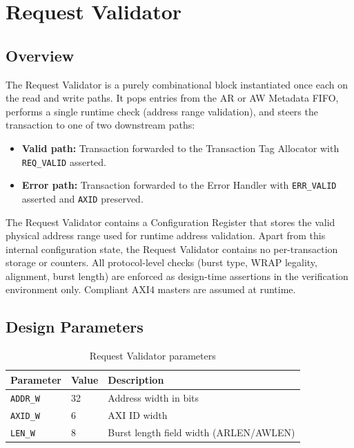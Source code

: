 \section{Request Validator}
\subsection{Overview}

The Request Validator is a purely combinational block instantiated once
each on the read and write paths. It pops entries from the AR or AW
Metadata FIFO, performs a single runtime check (address range
validation), and steers the transaction to one of two downstream paths:

\begin{itemize}
  \item \textbf{Valid path:} Transaction forwarded to the Transaction
        Tag Allocator with \texttt{REQ\_VALID} asserted.
  \item \textbf{Error path:} Transaction forwarded to the Error Handler
        with \texttt{ERR\_VALID} asserted and \texttt{AXID} preserved.
\end{itemize}

The Request Validator contains a Configuration Register that stores the valid physical address range used for runtime address validation. 
Apart from this internal configuration state, the Request Validator contains no per-transaction storage or counters.
All protocol-level checks (burst type, WRAP legality, alignment, burst
length) are enforced as design-time assertions in the verification
environment only. Compliant AXI4 masters are assumed at runtime.

\subsection{Design Parameters}

\begin{table}[h!]
\centering
\begin{tabular}{lll}
\toprule
\textbf{Parameter} & \textbf{Value} & \textbf{Description} \\
\midrule
\texttt{ADDR\_W}  & 32 & Address width in bits \\
\texttt{AXID\_W}  & 6  & AXI ID width \\
\texttt{LEN\_W}   & 8  & Burst length field width (ARLEN/AWLEN) \\
\bottomrule
\end{tabular}
\caption{Request Validator parameters}
\end{table}

